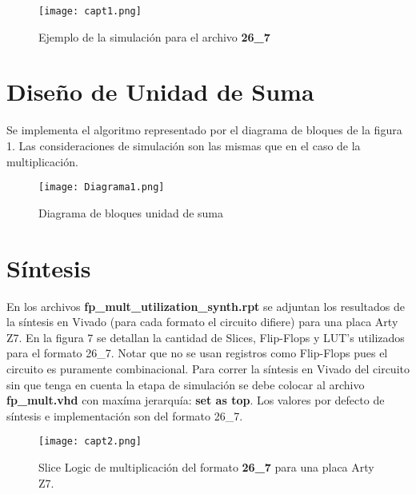 \documentclass[a4paper, 10pt, spanish]{article}
\numberwithin{equation}{section}
\numberwithin{table}{section}
\begin{document}
\vspace{2cm}
\begin{figure}[h!]
\begin{center}
    \hspace{2cm}
    \texttt{[image: capt1.png]}
\end{center}
\caption{Ejemplo de la simulación para el archivo \textbf{26\_7}}
\end{figure}

\newpage
\section{Diseño de Unidad de Suma}
Se implementa el algoritmo representado por el diagrama de bloques de la figura 1. Las consideraciones de simulación son las mismas que en el caso de la multiplicación.
\begin{figure}[h!]
\begin{center}
    \hspace{2cm}
    \texttt{[image: Diagrama1.png]}
\end{center}
\caption{Diagrama de bloques unidad de suma}

\end{figure}
\section{Síntesis}
En los archivos \textbf{fp\_mult\_utilization\_synth.rpt} se adjuntan los resultados de la síntesis en Vivado (para cada formato el circuito difiere) para una placa Arty Z7. En la figura 7 se detallan la cantidad de Slices, Flip-Flops y LUT's utilizados para el formato 26\_7. Notar que no se usan registros como Flip-Flops pues el circuito es puramente combinacional. Para correr la síntesis en Vivado del circuito sin que tenga en cuenta la etapa de simulación se debe colocar al archivo \textbf{fp\_mult.vhd} con maxíma jerarquía: \textbf{set as top}. Los valores por defecto de síntesis e implementación son del formato 26\_7.

\begin{figure}[h!]
\begin{center}
    \hspace{2cm}
    \texttt{[image: capt2.png]}
\end{center}
\caption{Slice Logic de multiplicación del formato \textbf{26\_7} para una placa Arty Z7.}
\end{figure}

\end{document}
